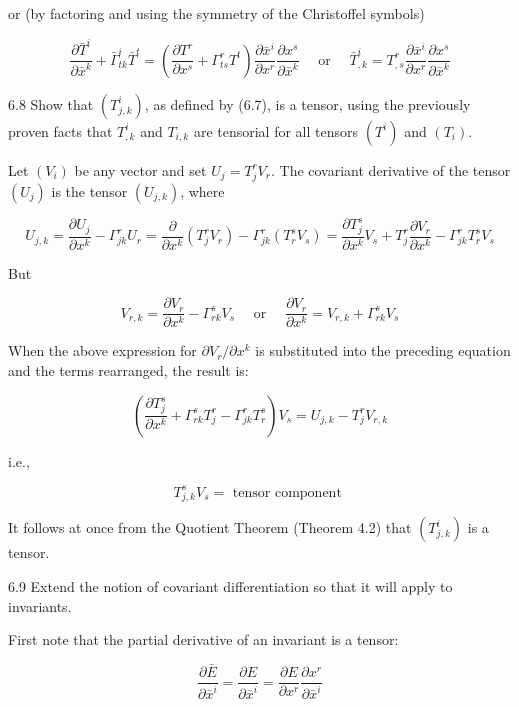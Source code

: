 \documentclass[10pt]{article}
\begin{document}
or (by factoring and using the symmetry of the Christoffel symbols)

$$
\frac{\partial \bar{T}^{i}}{\partial \bar{x}^{k}}+\bar{\Gamma}_{t k}^{i} \bar{T}^{t}=\left(\frac{\partial T^{r}}{\partial x^{s}}+\Gamma_{t s}^{r} T^{t}\right) \frac{\partial \bar{x}^{i}}{\partial x^{r}} \frac{\partial x^{s}}{\partial \bar{x}^{k}} \quad \text { or } \quad \bar{T}_{, k}^{i}=T_{, s}^{r} \frac{\partial \bar{x}^{i}}{\partial x^{r}} \frac{\partial x^{s}}{\partial \bar{x}^{k}}
$$

6.8 Show that $\left(T_{j, k}^{i}\right)$, as defined by (6.7), is a tensor, using the previously proven facts that $T_{, k}^{i}$ and $T_{i, k}$ are tensorial for all tensors $\left(T^{i}\right)$ and $\left(T_{i}\right)$.

Let $\left(V_{i}\right)$ be any vector and set $U_{j}=T_{j}^{r} V_{r}$. The covariant derivative of the tensor $\left(U_{j}\right)$ is the tensor $\left(U_{j, k}\right)$, where

$$
U_{j, k}=\frac{\partial U_{j}}{\partial x^{k}}-\Gamma_{j k}^{r} U_{r}=\frac{\partial}{\partial x^{k}}\left(T_{j}^{r} V_{r}\right)-\Gamma_{j k}^{r}\left(T_{r}^{s} V_{s}\right)=\frac{\partial T_{j}^{s}}{\partial x^{k}} V_{s}+T_{j}^{r} \frac{\partial V_{r}}{\partial x^{k}}-\Gamma_{j k}^{r} T_{r}^{s} V_{s}
$$

But

$$
V_{r, k}=\frac{\partial V_{r}}{\partial x^{k}}-\Gamma_{r k}^{s} V_{s} \quad \text { or } \quad \frac{\partial V_{r}}{\partial x^{k}}=V_{r, k}+\Gamma_{r k}^{s} V_{s}
$$

When the above expression for $\partial V_{r} / \partial x^{k}$ is substituted into the preceding equation and the terms rearranged, the result is:

$$
\left(\frac{\partial T_{j}^{s}}{\partial x^{k}}+\Gamma_{r k}^{s} T_{j}^{r}-\Gamma_{j k}^{r} T_{r}^{s}\right) V_{s}=U_{j, k}-T_{j}^{r} V_{r, k}
$$

i.e.,

$$
T_{j, k}^{s} V_{s}=\text { tensor component }
$$

It follows at once from the Quotient Theorem (Theorem 4.2) that $\left(T_{j, k}^{i}\right)$ is a tensor.

6.9 Extend the notion of covariant differentiation so that it will apply to invariants.

First note that the partial derivative of an invariant is a tensor:

$$
\frac{\partial \bar{E}}{\partial \bar{x}^{i}}=\frac{\partial E}{\partial \bar{x}^{i}}=\frac{\partial E}{\partial x^{r}} \frac{\partial x^{r}}{\partial \bar{x}^{i}}
$$
\end{document}
